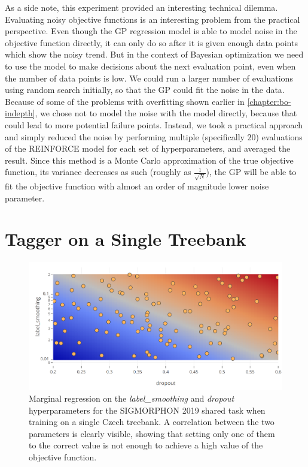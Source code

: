 As a side note, this experiment provided an interesting technical dilemma.
Evaluating noisy objective functions is an interesting problem from the
practical perspective. Even though the GP regression model is able to model
noise in the objective function directly, it can only do so after it is given
enough data points which show the noisy trend. But in the context of Bayesian
optimization we need to use the model to make decisions about the next
evaluation point, even when the number of data points is low. We could run a
larger number of evaluations using random search initially, so that the GP
could fit the noise in the data. Because of some of the problems with
overfitting shown earlier in \autoref{chapter:bo-indepth}, we chose not to
model the noise with the model directly, because that could lead to more
potential failure points. Instead, we took a practical approach and simply
reduced the noise by performing multiple (specifically $20$) evaluations of the
REINFORCE model for each set of hyperparameters, and averaged the result. Since
this method is a Monte Carlo approximation of the true objective function, its
variance decreases as such (roughly as $\frac{1}{\sqrt{N}}$), the GP will be
able to fit the objective function with almost an order of magnitude lower
noise parameter.


\section{Tagger on a Single Treebank}
\label{section:exp-cestina}

\begin{figure}
	\begin{center}
		\includegraphics[width=1.0\textwidth]{images/czech-2d-marginal.png}
		\caption{Marginal regression on the \emph{label\_smoothing} and \emph{dropout} hyperparameters for the SIGMORPHON 2019 shared task when training on a single Czech treebank. A correlation between the two parameters is clearly visible, showing that setting only one of them to the correct value is not enough to achieve a high value of the objective function.}
		\label{figure:czech-2d-marginal}
	\end{center}
\end{figure}

